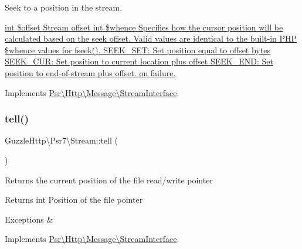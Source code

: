 Seek to a position in the stream.

\hyperlink{}{int \$offset Stream offset  int \$whence Specifies how the cursor position will be calculated based on the seek offset. Valid values are identical to the built-\/in P\+HP \$whence values for {\ttfamily fseek()}. S\+E\+E\+K\+\_\+\+S\+E\+T\+: Set position equal to offset bytes S\+E\+E\+K\+\_\+\+C\+U\+R\+: Set position to current location plus offset S\+E\+E\+K\+\_\+\+E\+N\+D\+: Set position to end-\/of-\/stream plus offset.   on failure. }

Implements \hyperlink{interfacePsr_1_1Http_1_1Message_1_1StreamInterface_a96ee062dc6cf4022d655dd15eaa81208}{Psr\textbackslash{}\+Http\textbackslash{}\+Message\textbackslash{}\+Stream\+Interface}.

\mbox{\label{classGuzzleHttp_1_1Psr7_1_1Stream_a8340644980841db5830ef26a661dcc6d}} 
\subsubsection{\texorpdfstring{tell()}{tell()}}
{\footnotesize\ttfamily Guzzle\+Http\textbackslash{}\+Psr7\textbackslash{}\+Stream\+::tell (\begin{DoxyParamCaption}{ }\end{DoxyParamCaption})}

Returns the current position of the file read/write pointer

\begin{DoxyReturn}{Returns}
int Position of the file pointer 
\end{DoxyReturn}

\begin{DoxyExceptions}{Exceptions}
{\em } & \\
\hline
\end{DoxyExceptions}


Implements \hyperlink{interfacePsr_1_1Http_1_1Message_1_1StreamInterface_a9aa2f88a38f496d74100f42ddf0656ef}{Psr\textbackslash{}\+Http\textbackslash{}\+Message\textbackslash{}\+Stream\+Interface}.

\mbox{\label{classGuzzleHttp_1_1Psr7_1_1Stream_a53602289e59e6b492463c0295211f698}} 
